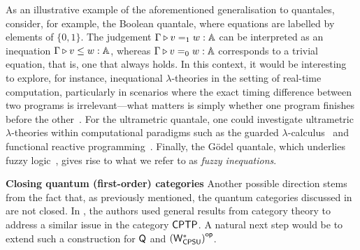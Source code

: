 As an illustrative example of the aforementioned generalisation to quantales, consider, for example, the Boolean quantale, where equations are labelled by elements of $\{0,1\}$. The judgement $\Gamma \triangleright v =_{1} w : \mathbb{A}$ can be interpreted as an inequation $\Gamma \triangleright v \leq w : \mathbb{A}$, whereas $\Gamma \triangleright v =_{0} w : \mathbb{A}$ corresponds to a trivial equation, that is, one that always holds.  In this context, it would be interesting to explore, for instance, inequational $\lambda$-theories in the setting of real-time computation, particularly in scenarios where the exact timing difference between two programs is irrelevant---what matters is simply whether one program finishes before the other~\cite{dahlqvist2023syntactic}. For the ultrametric quantale, one could investigate ultrametric $\lambda$-theories within computational paradigms such as the guarded $\lambda$-calculus~\cite{guarded_ultrametric} and functional reactive programming~\cite{Ultrametric_reactive}. Finally, the Gödel quantale, which underlies fuzzy logic~\cite{deneckeGaloisConnectionsApplications2004}, gives rise to what we refer to as \emph{fuzzy inequations}.








\textbf{Closing quantum (first-order) categories}
Another possible direction stems from the fact that, as previously mentioned, the quantum categories discussed in  are not closed. In \cite{dahlqvist2023syntactic}, the authors used general results from category theory to address a similar issue in the category $\mathsf{CPTP}$. A natural next step would be to extend such a construction for $\mathsf{Q}$ and $\left(\mathsf{W^*_{CPSU}}\right)^{\mathsf{op}}$.


